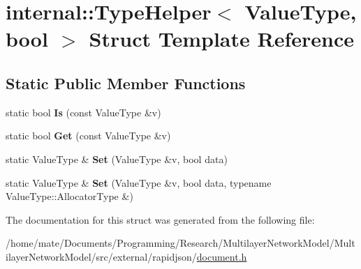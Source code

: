 \hypertarget{structinternal_1_1TypeHelper_3_01ValueType_00_01bool_01_4}{}\section{internal\+:\+:Type\+Helper$<$ Value\+Type, bool $>$ Struct Template Reference}
\label{structinternal_1_1TypeHelper_3_01ValueType_00_01bool_01_4}
\subsection*{Static Public Member Functions}
\begin{DoxyCompactItemize}
\item 
static bool {\bfseries Is} (const Value\+Type \&v)\hypertarget{structinternal_1_1TypeHelper_3_01ValueType_00_01bool_01_4_aa73fb8b4ed649706f7f9165401f89c27}{}\label{structinternal_1_1TypeHelper_3_01ValueType_00_01bool_01_4_aa73fb8b4ed649706f7f9165401f89c27}

\item 
static bool {\bfseries Get} (const Value\+Type \&v)\hypertarget{structinternal_1_1TypeHelper_3_01ValueType_00_01bool_01_4_aed612b233e5985d049248b414fb0034a}{}\label{structinternal_1_1TypeHelper_3_01ValueType_00_01bool_01_4_aed612b233e5985d049248b414fb0034a}

\item 
static Value\+Type \& {\bfseries Set} (Value\+Type \&v, bool data)\hypertarget{structinternal_1_1TypeHelper_3_01ValueType_00_01bool_01_4_a4bfa644e57e7d725468ed78103c1579a}{}\label{structinternal_1_1TypeHelper_3_01ValueType_00_01bool_01_4_a4bfa644e57e7d725468ed78103c1579a}

\item 
static Value\+Type \& {\bfseries Set} (Value\+Type \&v, bool data, typename Value\+Type\+::\+Allocator\+Type \&)\hypertarget{structinternal_1_1TypeHelper_3_01ValueType_00_01bool_01_4_a01a2bdf4117fb767c8d703be9e0f5f1d}{}\label{structinternal_1_1TypeHelper_3_01ValueType_00_01bool_01_4_a01a2bdf4117fb767c8d703be9e0f5f1d}

\end{DoxyCompactItemize}


The documentation for this struct was generated from the following file\+:\begin{DoxyCompactItemize}
\item 
/home/mate/\+Documents/\+Programming/\+Research/\+Multilayer\+Network\+Model/\+Multilayer\+Network\+Model/src/external/rapidjson/\hyperlink{document_8h}{document.\+h}\end{DoxyCompactItemize}
